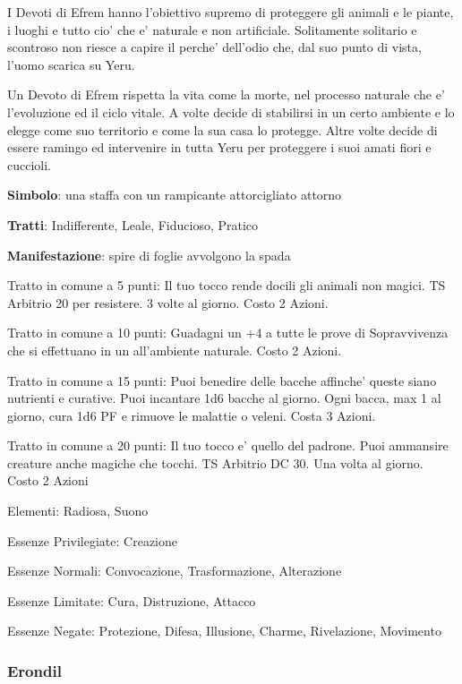 \documentclass[a4paper,11pt,twoside,openany]{dndbook}
\begin{document}
{I Devoti di Efrem hanno l'obiettivo supremo di proteggere gli animali e le piante, i luoghi e tutto cio' che e' naturale e non artificiale. Solitamente solitario e scontroso non riesce a capire il perche' dell'odio che, dal suo punto di vista, l'uomo scarica su Yeru.

Un Devoto di Efrem rispetta la vita come la morte, nel processo naturale che e' l'evoluzione ed il ciclo vitale. A volte decide di stabilirsi in un certo ambiente e lo elegge come suo territorio e come la sua casa lo protegge. Altre volte decide di essere ramingo ed intervenire in tutta Yeru per proteggere i suoi amati fiori e cuccioli.

\textbf{Simbolo}: una staffa con un rampicante attorcigliato attorno

\textbf{Tratti}: Indifferente, Leale, Fiducioso, Pratico

\textbf{Manifestazione}: spire di foglie avvolgono la spada

\bigskip

Tratto in comune a 5 punti: Il tuo tocco rende docili gli animali non magici. TS Arbitrio 20 per resistere. 3 volte al giorno. Costo 2 Azioni.

Tratto in comune a 10 punti: Guadagni un +4 a tutte le prove di Sopravvivenza che si effettuano in un all'ambiente naturale. Costo 2 Azioni.

Tratto in comune a 15 punti: Puoi benedire delle bacche affinche' queste siano nutrienti e curative. Puoi incantare 1d6 bacche al giorno. Ogni bacca, max 1 al giorno, cura 1d6 PF e rimuove le malattie o veleni. Costa 3 Azioni.

Tratto in comune a 20 punti: Il tuo tocco e' quello del padrone. Puoi ammansire creature anche magiche che tocchi. TS Arbitrio DC 30. Una volta al giorno. Costo 2 Azioni

\bigskip

Elementi: Radiosa, Suono

\bigskip

Essenze Privilegiate: Creazione

Essenze Normali: Convocazione, Trasformazione, Alterazione

Essenze Limitate: Cura, Distruzione, Attacco

Essenze Negate: Protezione, Difesa, Illusione, Charme, Rivelazione, Movimento

\subsubsection{Erondil}

}
\end{document}
